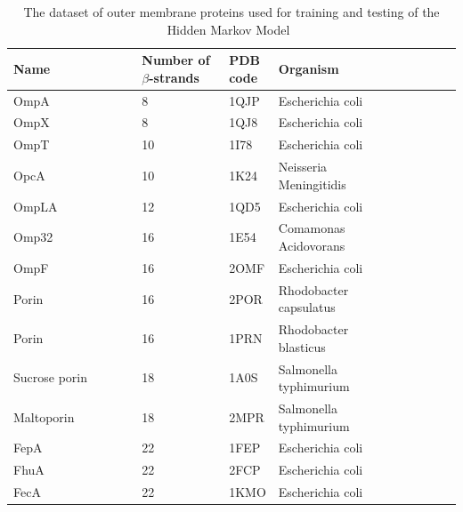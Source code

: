 \documentclass[
	a4paper, %
	11pt, %
	unnumberedsections, %
	twoside, %
  ]{LTJournalArticle}
\begin{document}
\begin{table}
	\caption{The dataset of outer membrane proteins used for training and testing of the Hidden Markov Model~\cite{bagos_hidden_2004}}
	\centering
	\begin{tabular}{L{0.3\linewidth} L{0.2\linewidth} L{0.1\linewidth}L{0.3\linewidth}L{0.3\linewidth}L{0.4\linewidth}} 
        \toprule
        Name          & Number of $\beta$-strands & PDB code & Organism               \\ \midrule
        OmpA          & 8                         & 1QJP     & Escherichia coli       \\
        OmpX          & 8                         & 1QJ8     & Escherichia coli       \\
        OmpT          & 10                        & 1I78     & Escherichia coli       \\
        OpcA          & 10                        & 1K24     & Neisseria Meningitidis \\
        OmpLA         & 12                        & 1QD5     & Escherichia coli       \\
        Omp32         & 16                        & 1E54     & Comamonas Acidovorans  \\
        OmpF          & 16                        & 2OMF     & Escherichia coli       \\
        Porin         & 16                        & 2POR     & Rhodobacter capsulatus \\
        Porin         & 16                        & 1PRN     & Rhodobacter blasticus  \\
        Sucrose porin & 18                        & 1A0S     & Salmonella typhimurium \\
        Maltoporin    & 18                        & 2MPR     & Salmonella typhimurium \\
        FepA          & 22                        & 1FEP     & Escherichia coli       \\
        FhuA          & 22                        & 2FCP     & Escherichia coli       \\
        FecA          & 22                        & 1KMO     & Escherichia coli       \\
        \bottomrule
    \end{tabular}
	\label{tab:dataset}
\end{table}
\end{document}
